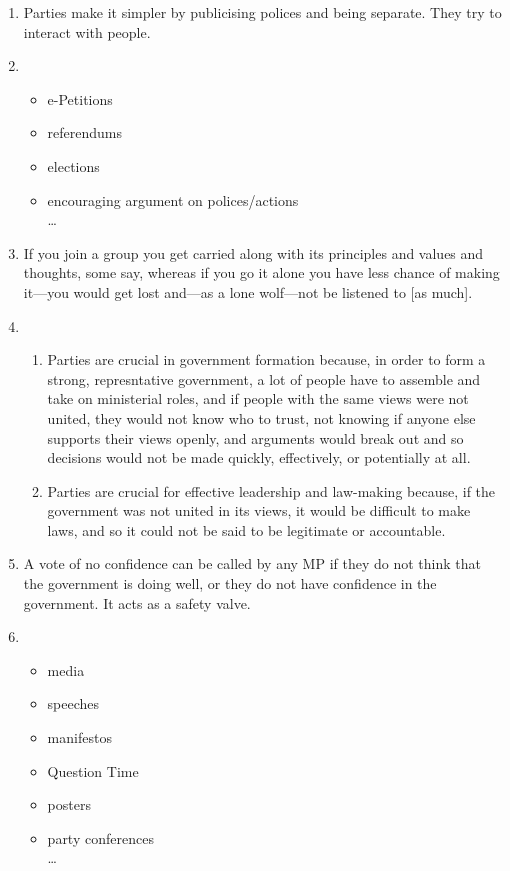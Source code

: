 \documentclass[a4paper,12pt]{article}
\begin{document}
\begin{enumerate}
	\item{Parties make it simpler by publicising polices and being separate.  They try to interact with people.}
	\item{\begin{itemize}
		\item{e-Petitions}
		\item{referendums}
		\item{elections}
		\item{encouraging argument on polices\slash actions}\\
		\ldots
	      \end{itemize}}
	\item{If you join a group you get carried along with its principles and values and thoughts, some say, whereas if you go it alone you have less chance of making it---you would get lost and---as a lone wolf---not be listened to [as much].}
	\item{\begin{enumerate}
		\item{Parties are crucial in government formation because, in order to form a strong, represntative government, a lot of people have to assemble and take on ministerial roles, and if people with the same views were not united, they would not know who to trust, not knowing if anyone else supports their views openly, and arguments would break out and so decisions would not be made quickly, effectively, or potentially at all.}
		\item{Parties are crucial for effective leadership and law-making because, if the government was not united in its views, it would be difficult to make laws, and so it could not be said to be legitimate or accountable.}
		\end{enumerate}}
		\item{A vote of no confidence can be called by any MP if they do not think that the government is doing well, or they do not have confidence in the government.  It acts as a safety valve.}
		\item{\begin{itemize}
			\item{media}
			\item{speeches}
			\item{manifestos}
			\item{Question Time}
			\item{posters}
			\item{party conferences}\\
			\ldots
		      \end{itemize}}
\end{enumerate}
\end{document}
